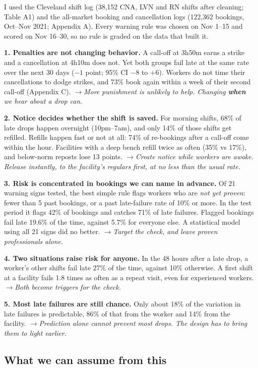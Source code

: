 \documentclass[11pt]{article}
\newcommand{\so}{$\rightarrow$\enspace}
\begin{document}
I used the Cleveland shift log (38,152 CNA, LVN and RN shifts after cleaning; Table A1) and the all-market booking and cancellation logs (122,362
bookings, Oct--Nov 2021; Appendix A). Every warning rule was chosen on Nov 1--15 and scored on Nov 16--30, so no rule is
graded on the data that built it.

\textbf{1. Penalties are not changing behavior.} A call-off at 3h50m earns a strike and a cancellation at 4h10m does
not. Yet both groups fail late at the same rate over the next 30 days ($-1$ point; 95\% CI $-8$ to $+6$). Workers do not
time their cancellations to dodge strikes, and 73\% book again within a week of their second call-off (Appendix C).
\so\emph{More punishment is unlikely to help. Changing \textbf{when} we hear about a drop can.}

\textbf{2. Notice decides whether the shift is saved.} For morning shifts, 68\% of late drops happen overnight
(10pm--7am), and only 14\% of those shifts get refilled. Refills happen fast or not at all: 74\% of re-bookings after a
call-off come within the hour. Facilities with a deep bench refill twice as often (35\% vs 17\%), and below-norm reposts
lose 13 points. \so\emph{Create notice while workers are awake. Release instantly, to the facility's regulars first, at
no less than the usual rate.}

\textbf{3. Risk is concentrated in bookings we can name in advance.} Of 21 warning signs tested, the best simple rule
flags workers who are \emph{not yet proven}: fewer than 5 past bookings, or a past late-failure rate of 10\% or more. In
the test period it flags 42\% of bookings and catches 71\% of late failures. Flagged bookings fail late 19.6\% of the
time, against 5.7\% for everyone else. A statistical model using all 21 signs did no better.
\so\emph{Target the check, and leave proven professionals alone.}

\textbf{4. Two situations raise risk for anyone.} In the 48 hours after a late drop, a worker's other shifts fail late
27\% of the time, against 10\% otherwise. A first shift at a facility fails 1.8 times as often as a repeat visit, even
for experienced workers. \so\emph{Both become triggers for the check.}

\textbf{5. Most late failures are still chance.} Only about 18\% of the variation in late failures is predictable, 86\%
of that from the worker and 14\% from the facility. \so\emph{Prediction alone cannot prevent most drops. The design has
to bring them to light earlier.}

\subsection{What we can assume from this}
\end{document}
